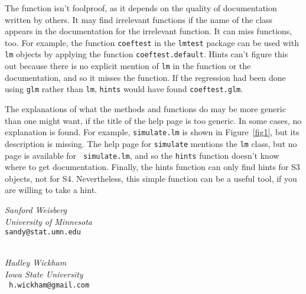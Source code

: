 \documentclass{report}
\begin{document}
\begin{article}
The function isn't foolproof, as it depends on the quality of 
documentation written by others. It may find irrelevant 
functions if the name of the class appears in the documentation 
for the irrelevant function.  It can miss functions, too.  For 
example, the function {\tt coeftest} in the {\tt lmtest} 
package can be used with {\tt lm} objects by applying the 
function {\tt coeftest.default}.  Hints can't figure this out 
because there is no explicit mention of {\tt lm} in the 
function or the documentation, and so it misses the function.  
If the regression had been done using {\tt glm} rather than 
{\tt lm}, {\tt hints} would have found {\tt coeftest.glm}.

The explanations of what the methods and functions do may be
more generic than one might want, if the title of the help page
is too generic. In some cases, no explanation is found. For
example, {\tt simulate.lm} is shown in Figure~\ref{fig1}, but
its description is missing. The help page for {\tt simulate}
mentions the {\tt lm} class, but no page is available for {\tt
simulate.lm}, and so the {\tt hints} function doesn't know
where to get documentation. Finally, the hints function can
only find hints for S3 objects, not for S4. Nevertheless, this
simple function can be a useful tool, if you are willing to
take a hint.

\begin{flushleft}
{\em Sanford Weisberg\\
University of Minnesota\\} {\tt sandy@stat.umn.edu}

\ \\
{\em Hadley Wickham\\Iowa State University\\}{\tt
h.wickham@gmail.com}
\end{flushleft}

\end{article}
\end{document}
